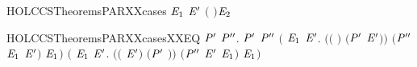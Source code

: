 \begin{SaveVerbatim}{HOLCCSTheoremsPARXXcases}
        \HOLTokenTransBegin{} \HOLTokenTransEnd \ensuremath{\HOLBoundVar{E}\sb{\mathrm{1}}} \HOLSymConst{\HOLTokenConj{}} \ensuremath{\HOLBoundVar{E}\sp{\prime{}}} \HOLTokenTransBegin{} \ensuremath{(} \ensuremath{)}\HOLTokenTransEnd \ensuremath{\HOLBoundVar{E}\sb{\mathrm{2}}}
\end{SaveVerbatim}
\newcommand{\HOLCCSTheoremsPARXXcases}{\UseVerbatim{HOLCCSTheoremsPARXXcases}}
\begin{SaveVerbatim}{HOLCCSTheoremsPARXXcasesXXEQ}
\HOLTokenTurnstile{} \HOLSymConst{\HOLTokenForall{}} \ensuremath{\HOLBoundVar{P}\sp{\prime{}}}  \ensuremath{\HOLBoundVar{P}\sp{\prime{}\prime{}}}.
      \HOLSymConst{\ensuremath{\mid}} \ensuremath{\HOLBoundVar{P}\sp{\prime{}}} \HOLTokenTransBegin{}\HOLTokenTransEnd \ensuremath{\HOLBoundVar{P}\sp{\prime{}\prime{}}} \HOLSymConst{\HOLTokenEquiv{}}
     \ensuremath{(}\HOLSymConst{\HOLTokenExists{}} \ensuremath{\HOLBoundVar{E}\sb{\mathrm{1}}} \ensuremath{\HOLBoundVar{E}\sp{\prime{}}}.
        \ensuremath{(}\ensuremath{(} \HOLSymConst{\ensuremath{=}} \ensuremath{)} \HOLSymConst{\HOLTokenConj{}} \ensuremath{(}\ensuremath{\HOLBoundVar{P}\sp{\prime{}}} \HOLSymConst{\ensuremath{=}} \ensuremath{\HOLBoundVar{E}\sp{\prime{}}}\ensuremath{)}\ensuremath{)} \HOLSymConst{\HOLTokenConj{}} \ensuremath{(}\ensuremath{\HOLBoundVar{P}\sp{\prime{}\prime{}}} \HOLSymConst{\ensuremath{=}} \ensuremath{\HOLBoundVar{E}\sb{\mathrm{1}}} \HOLSymConst{\ensuremath{\mid}} \ensuremath{\HOLBoundVar{E}\sp{\prime{}}}\ensuremath{)} \HOLSymConst{\HOLTokenConj{}}  \HOLTokenTransBegin{}\HOLTokenTransEnd \ensuremath{\HOLBoundVar{E}\sb{\mathrm{1}}}\ensuremath{)} \HOLSymConst{\HOLTokenDisj{}}
     \ensuremath{(}\HOLSymConst{\HOLTokenExists{}} \ensuremath{\HOLBoundVar{E}\sb{\mathrm{1}}} \ensuremath{\HOLBoundVar{E}\sp{\prime{}}}.
        \ensuremath{(}\ensuremath{(} \HOLSymConst{\ensuremath{=}} \ensuremath{\HOLBoundVar{E}\sp{\prime{}}}\ensuremath{)} \HOLSymConst{\HOLTokenConj{}} \ensuremath{(}\ensuremath{\HOLBoundVar{P}\sp{\prime{}}} \HOLSymConst{\ensuremath{=}} \ensuremath{)}\ensuremath{)} \HOLSymConst{\HOLTokenConj{}} \ensuremath{(}\ensuremath{\HOLBoundVar{P}\sp{\prime{}\prime{}}} \HOLSymConst{\ensuremath{=}} \ensuremath{\HOLBoundVar{E}\sp{\prime{}}} \HOLSymConst{\ensuremath{\mid}} \ensuremath{\HOLBoundVar{E}\sb{\mathrm{1}}}\ensuremath{)} \HOLSymConst{\HOLTokenConj{}}  \HOLTokenTransBegin{}\HOLTokenTransEnd \ensuremath{\HOLBoundVar{E}\sb{\mathrm{1}}}\ensuremath{)} \HOLSymConst{\HOLTokenDisj{}}

\end{SaveVerbatim}
